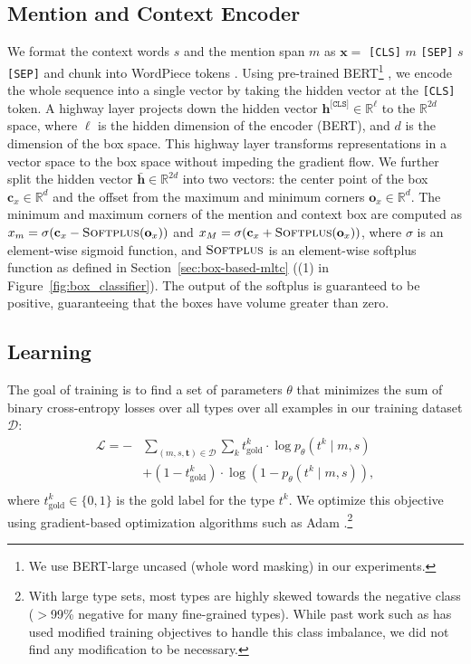 \documentclass[11pt,a4paper]{article}
\begin{document}
\subsection{Mention and Context Encoder}
\label{sec:encoder}

We format the context words $s$ and the mention span $m$ as $\mathbf{x} =$ {\tt[CLS]} $m$  {\tt[SEP]} $s$ {\tt[SEP]} and chunk into WordPiece tokens \citep{Yonghui_Wu_16}. Using pre-trained BERT\footnote{We use BERT-large uncased (whole word masking) in our experiments.} \citep{Jacob_Devlin_19}, we encode the whole sequence into a single vector by taking the hidden vector at the {\tt [CLS]} token. A highway layer \citep{Rupesh_Kumar_Srivastava_15} projects down the hidden vector $\mathbf{h}^{\texttt{[CLS]}} \in \mathbb{R}^{\ell}$ to the $\mathbb{R}^{2d}$ space, where $\ell$ is the hidden dimension of the encoder (BERT), and $d$ is the dimension of the box space. This highway layer transforms representations in a vector space to the box space without impeding the gradient flow. We further split the hidden vector $\mathbf{\bar h} \in \mathbb{R}^{2d}$ into two vectors: the center point of the box $\mathbf{c}_x \in \mathbb{R}^{d}$ and the offset from the maximum and minimum corners $\mathbf{o}_x \in \mathbb{R}^{d}$. The minimum and maximum corners of the mention and context box are computed as $x_m = \sigma(\mathbf{c}_x - \textsc{Softplus}(\mathbf{o}_x))$ and $x_M = \sigma(\mathbf{c}_x + \textsc{Softplus}(\mathbf{o}_x))$, where $\sigma$ is an element-wise sigmoid function, and $\textsc{Softplus}$ is an element-wise softplus function as defined in Section~\ref{sec:box-based-mltc} ((1) in Figure~\ref{fig:box_classifier}). The output of the softplus is guaranteed to be positive, guaranteeing that the boxes have volume greater than zero.


\subsection{Learning} 
\label{sec:learning}

The goal of training is to find a set of parameters $\theta$ that minimizes the sum of binary cross-entropy losses over all types over all examples in our training dataset $\mathcal{D}$:
\begin{equation*}\label{eq:loss}
\begin{aligned}
\mathcal{L} = - &\sum_{(m, s, \mathbf{t}) \in \mathcal{D}}  \sum_{k} t^k_{\text{gold}} \cdot \log p_\theta(t^k \mid m, s)\\
&+ (1 - t^k_{\text{gold}}) \cdot \log (1 - p_\theta(t^k \mid m, s)),\\
\end{aligned}
\end{equation*}
where $t^k_{\text{gold}} \in \{0, 1\}$ is the gold label for the type $t^k$. We optimize this objective using gradient-based optimization algorithms such as Adam \cite{Kingma_14}.\footnote{With large type sets, most types are highly skewed towards the negative class ($>$99\% negative for many fine-grained types). While past work such as \citet{Eunsol_Choi_18} has used modified training objectives to handle this class imbalance, we did not find any modification to be necessary.}
\end{document}
